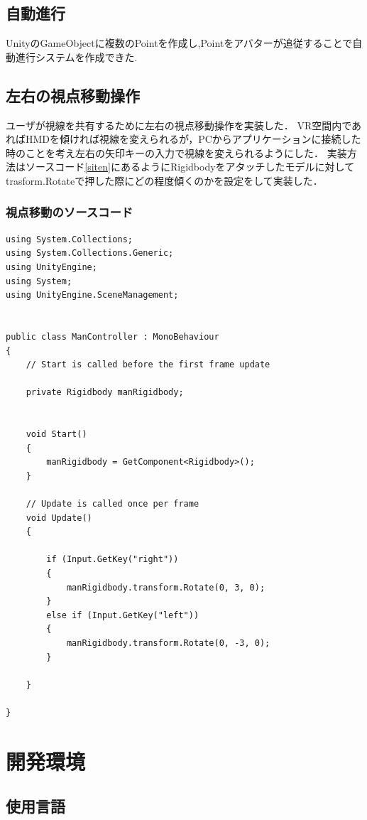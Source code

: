\documentclass[12pt,a4j,titlepage]{ltjsarticle}
\begin{document}
\subsection{自動進行}
UnityのGameObjectに複数のPointを作成し,Pointをアバターが追従することで自動進行システムを作成できた.

\subsection{左右の視点移動操作}
ユーザが視線を共有するために左右の視点移動操作を実装した．
VR空間内であればHMDを傾ければ視線を変えられるが，PCからアプリケーションに接続した時のことを考え左右の矢印キーの入力で視線を変えられるようにした．
実装方法はソースコード\ref{siten}にあるようにRigidbodyをアタッチしたモデルに対してtrasform.Rotateで押した際にどの程度傾くのかを設定をして実装した．
\subsubsection{視点移動のソースコード}
\begin{lstlisting}[caption=視点移動,label=siten]
using System.Collections;
using System.Collections.Generic;
using UnityEngine;
using System;
using UnityEngine.SceneManagement;


public class ManController : MonoBehaviour
{
    // Start is called before the first frame update
   
    private Rigidbody manRigidbody;
  

    void Start()
    {
        manRigidbody = GetComponent<Rigidbody>();
    }

    // Update is called once per frame
    void Update()
    {
        
        if (Input.GetKey("right"))
        {
            manRigidbody.transform.Rotate(0, 3, 0);
        }
        else if (Input.GetKey("left"))
        {
            manRigidbody.transform.Rotate(0, -3, 0);
        }
    
    }

}
\end{lstlisting}

\clearpage

\section{開発環境}
\subsection{使用言語}
\end{document}

